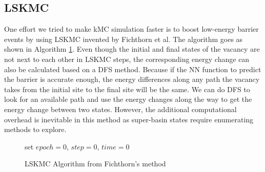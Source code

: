 \subsection{\acf{LSKMC}}
\label{Chap:Al/Vac:sec:LSKMC}
One effort we tried to make \ac{kMC} simulation faster is to boost low-energy barrier events by using \acf{LSKMC} invented by Fichthorn et al\cite{fichthorn2013local}. The algorithm goes as shown in Algorithm \ref{algo:lskmc}. Even though the initial and final states of the vacancy are not next to each other in \ac{LSKMC} steps, the corresponding energy change can also be calculated based on a \ac{DFS} method. Because if the \ac{NN} function to predict the barrier is accurate enough, the energy differences along any path the vacancy takes from the initial site to the final site will be the same. We can do \ac{DFS} to look for an available path and use the energy changes along the way to get the energy change between two states. However, the additional computational overhead is inevitable in this method as super-basin states require enumerating methods to explore.

\begin{figure}[!htb]
  \centering
  \begin{minipage}{.75\linewidth}
    \begin{algorithm}[H]
      \caption{\acf{LSKMC} Algorithm from  Fichthorn's method \cite{fichthorn2013local}}\label{algo:lskmc}
      \begin{algorithmic}[1]
        \State set $epoch = 0$, $step = 0$, $time = 0$
        \Else
        \EndIf
        \EndIf

        \EndWhile
      \end{algorithmic}
    \end{algorithm}
  \end{minipage}
\end{figure}


